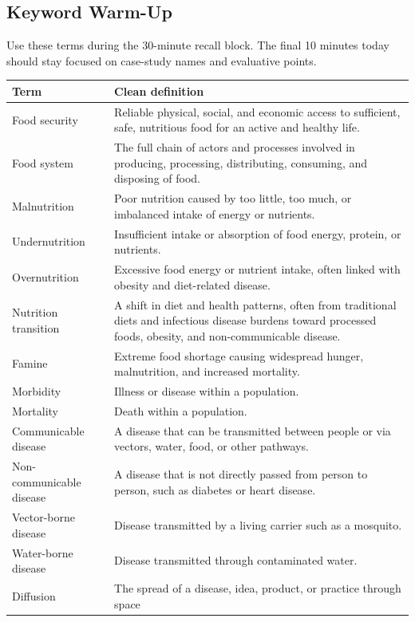 \documentclass[11pt,a4paper]{article}
\begin{document}
\subsection{Keyword Warm-Up}

Use these terms during the 30-minute recall block. The final 10 minutes today
should stay focused on case-study names and evaluative points.

\begin{tabularx}{\textwidth}{L{0.28\textwidth}Y}
\toprule
\textbf{Term} & \textbf{Clean definition} \\
\midrule
Food security & Reliable physical, social, and economic access to sufficient,
safe, nutritious food for an active and healthy life. \\
Food system & The full chain of actors and processes involved in producing,
processing, distributing, consuming, and disposing of food. \\
Malnutrition & Poor nutrition caused by too little, too much, or imbalanced
intake of energy or nutrients. \\
Undernutrition & Insufficient intake or absorption of food energy, protein, or
nutrients. \\
Overnutrition & Excessive food energy or nutrient intake, often linked with
obesity and diet-related disease. \\
Nutrition transition & A shift in diet and health patterns, often from
traditional diets and infectious disease burdens toward processed foods,
obesity, and non-communicable disease. \\
Famine & Extreme food shortage causing widespread hunger, malnutrition, and
increased mortality. \\
Morbidity & Illness or disease within a population. \\
Mortality & Death within a population. \\
Communicable disease & A disease that can be transmitted between people or via
vectors, water, food, or other pathways. \\
Non-communicable disease & A disease that is not directly passed from person
to person, such as diabetes or heart disease. \\
Vector-borne disease & Disease transmitted by a living carrier such as a
mosquito. \\
Water-borne disease & Disease transmitted through contaminated water. \\
Diffusion & The spread of a disease, idea, product, or practice through space

\end{tabularx}
\end{document}
